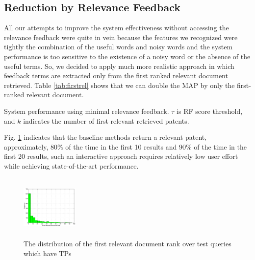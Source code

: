 \subsection{Reduction by Relevance Feedback}
All our attempts to improve the system effectiveness without accessing the relevance feedback were quite in vein because the features we recognized were tightly the combination of the useful words and noisy words and the system performance is too sensitive to the existence of a noisy word or the absence of the useful terms. So, we decided to apply much more realistic approach in which feedback terms are extracted only from the first ranked relevant document retrieved. Table \ref{tab:firstrel} shows that we can double the MAP by only the first-ranked relevant document.
\begin{table}[htpb]
  \begin{center}
   \caption{System performance using minimal relevance feedback. $\tau$ is RF score threshold, and $k$ indicates the number of first relevant retrieved patents.}\vspace{3mm}
     
  \label{tab:firstrel}
  \end{center}  
\end{table}
Fig. \ref{fig:FirstTPRankHisto} indicates that the baseline methods return a relevant patent, approximately, 80\% of the time in the first 10 results and 90\% of the time in the first 20 results, such an interactive approach requires relatively low user effort while achieving state-of-the-art performance.    
\begin{figure}[htpb]
   \centering
   \includegraphics[width=0.25\textwidth,height=32mm]{figs/FirstTPRank.eps}
   \caption{The distribution of the first relevant document rank over test queries which have TPs}   
   \label{fig:FirstTPRankHisto} 
\end{figure}